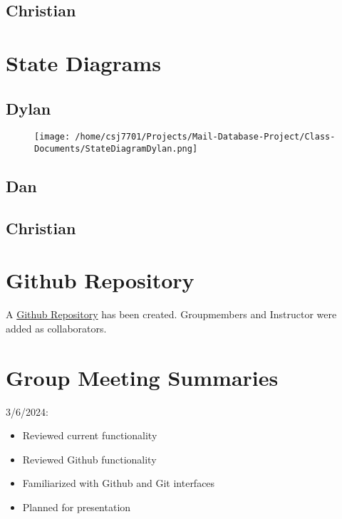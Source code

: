 \documentclass[11pt]{article}
\begin{document}
\subsection*{Christian}
\label{sec:org2f2d3ee}

\section*{State Diagrams}
\label{sec:org98e3b88}

\subsection*{Dylan}
\label{sec:org9c4d374}

\begin{figure}[htbp]
\centering
\texttt{[image: /home/csj7701/Projects/Mail-Database-Project/Class-Documents/StateDiagramDylan.png]}
\bicaption{---}
\end{figure}
\subsection*{Dan}
\label{sec:org181b79c}

\subsection*{Christian}
\label{sec:orgc31e2db}



\section*{Github Repository}
\label{sec:orgf5edf5c}

A \href{https://github.com/CSJ7701/Mail-Database-Project}{Github Repository} has been created. Groupmembers and Instructor were added as collaborators.

\section*{Group Meeting Summaries}
\label{sec:orgc9063da}

3/6/2024:
\begin{itemize}
\item Reviewed current functionality
\item Reviewed Github functionality
\item Familiarized with Github and Git interfaces
\item Planned for presentation
\end{itemize}
\end{document}
